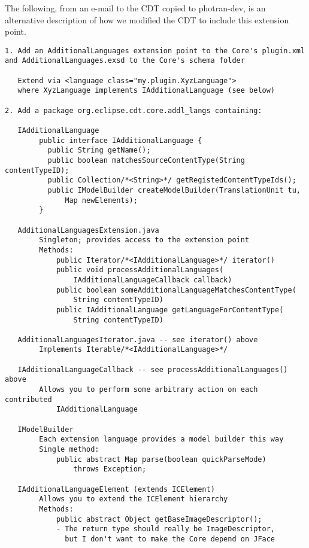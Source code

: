 
The following, from an e-mail to the CDT copied to photran-dev, is an
alternative description of how we modified the CDT to include this
extension point.

\begin{verbatim}
1. Add an AdditionalLanguages extension point to the Core's plugin.xml and AdditionalLanguages.exsd to the Core's schema folder

   Extend via <language class="my.plugin.XyzLanguage">
   where XyzLanguage implements IAdditionalLanguage (see below)

2. Add a package org.eclipse.cdt.core.addl_langs containing:

   IAdditionalLanguage
        public interface IAdditionalLanguage {
          public String getName();
          public boolean matchesSourceContentType(String contentTypeID);
          public Collection/*<String>*/ getRegistedContentTypeIds();
          public IModelBuilder createModelBuilder(TranslationUnit tu,
              Map newElements);
        }

   AdditionalLanguagesExtension.java
        Singleton; provides access to the extension point
        Methods:
            public Iterator/*<IAdditionalLanguage>*/ iterator()
            public void processAdditionalLanguages(
                IAdditionalLanguageCallback callback)
            public boolean someAdditionalLanguageMatchesContentType(
                String contentTypeID)
            public IAdditionalLanguage getLanguageForContentType(
                String contentTypeID)

   AdditionalLanguagesIterator.java -- see iterator() above
        Implements Iterable/*<IAdditionalLanguage>*/

   IAdditionalLanguageCallback -- see processAdditionalLanguages() above
        Allows you to perform some arbitrary action on each contributed
            IAdditionalLanguage

   IModelBuilder
        Each extension language provides a model builder this way
        Single method:
            public abstract Map parse(boolean quickParseMode)
                throws Exception;

   IAdditionalLanguageElement (extends ICElement)
        Allows you to extend the ICElement hierarchy
        Methods:
            public abstract Object getBaseImageDescriptor();
            - The return type should really be ImageDescriptor,
              but I don't want to make the Core depend on JFace


\end{verbatim}
